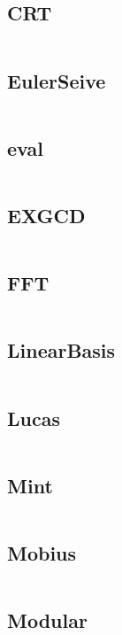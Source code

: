 \documentclass[a4]{article}
\begin{document}
\subsection{CRT}
\inputminted[mathescape,linenos,numbersep=5pt,frame=lines,framesep=2mm]{cpp}{src/math/CRT.cpp}
\subsection{EulerSeive}
\inputminted[mathescape,linenos,numbersep=5pt,frame=lines,framesep=2mm]{cpp}{src/math/EulerSeive.cpp}
\subsection{eval}
\inputminted[mathescape,linenos,numbersep=5pt,frame=lines,framesep=2mm]{cpp}{src/math/eval.cpp}
\subsection{EXGCD}
\inputminted[mathescape,linenos,numbersep=5pt,frame=lines,framesep=2mm]{cpp}{src/math/EXGCD.cpp}
\subsection{FFT}
\inputminted[mathescape,linenos,numbersep=5pt,frame=lines,framesep=2mm]{cpp}{src/math/FFT.cpp}
\subsection{LinearBasis}
\inputminted[mathescape,linenos,numbersep=5pt,frame=lines,framesep=2mm]{cpp}{src/math/LinearBasis.cpp}
\subsection{Lucas}
\inputminted[mathescape,linenos,numbersep=5pt,frame=lines,framesep=2mm]{cpp}{src/math/Lucas.cpp}
\subsection{Mint}
\inputminted[mathescape,linenos,numbersep=5pt,frame=lines,framesep=2mm]{cpp}{src/math/Mint.cpp}
\subsection{Mobius}
\inputminted[mathescape,linenos,numbersep=5pt,frame=lines,framesep=2mm]{cpp}{src/math/Mobius.cpp}
\subsection{Modular}
\inputminted[mathescape,linenos,numbersep=5pt,frame=lines,framesep=2mm]{cpp}{src/math/Modular.cpp}
\end{document}
